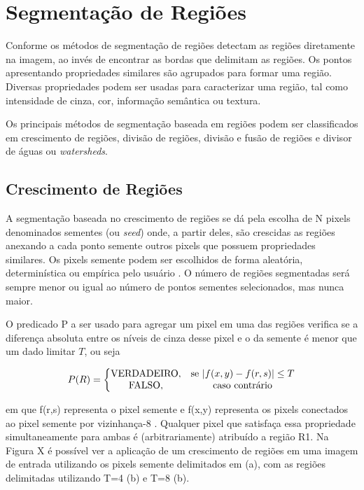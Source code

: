 \documentclass[12pt,oneside,a4paper,english,french,spanish,brazil,]{abntex2}
\begin{document}
\section{Segmentação de Regiões}
Conforme \cite{pedrini:2008} os métodos de segmentação de regiões detectam as regiões diretamente na imagem, ao invés de encontrar as bordas que delimitam as regiões. Os pontos apresentando propriedades similares são agrupados para formar uma região. Diversas propriedades podem ser usadas para caracterizar uma região, tal como intensidade de cinza, cor, informação semântica ou textura.

Os principais métodos de segmentação baseada em regiões podem ser classificados em crescimento de regiões, divisão de regiões, divisão e fusão de regiões e divisor de águas ou \textit{watersheds}.

\subsection{Crescimento de Regiões}

A segmentação baseada no crescimento de regiões se dá pela escolha de N pixels denominados sementes (ou \textit{seed}) onde, a partir deles, são crescidas as regiões anexando a cada ponto semente outros pixels que possuem propriedades similares. Os pixels semente podem ser escolhidos de forma aleatória, determinística ou empírica pelo usuário \cite{pedrini:2008}. O número de regiões segmentadas será sempre menor ou igual ao número de pontos sementes selecionados, mas nunca maior.

O predicado P a ser usado para agregar um pixel em uma das regiões verifica se a diferença absoluta entre os níveis de cinza desse pixel e o da semente é menor que um dado limitar \(T\), ou seja

\[P(R) = \left\{\begin{matrix}
\textup{VERDADEIRO}, & \textup{se }|f(x,y) - f(r,s)| \leq T\\ 
\textup{FALSO}, & \textup{caso contrário}
\end{matrix}\right.\]

em que f(r,s) representa o pixel semente e f(x,y) representa os pixels conectados ao pixel semente por vizinhança-8 \cite{pedrini:2008}. Qualquer pixel que satisfaça essa propriedade simultaneamente para ambas é (arbitrariamente) atribuído a região R1. Na Figura X é possível ver a aplicação de um crescimento de regiões em uma imagem de entrada utilizando os pixels semente delimitados em (a), com as regiões delimitadas utilizando T=4 (b) e T=8 (b).
\end{document}
